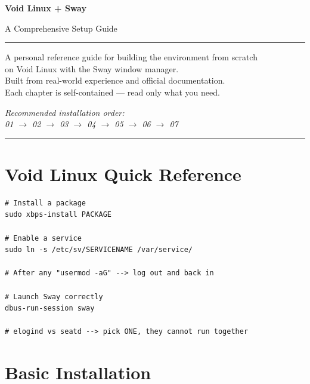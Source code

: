 \documentclass[12pt, a4paper]{book}
\begin{document}
\begin{titlepage}
  \centering
  \vspace*{4cm}
  {\Huge\bfseries Void Linux + Sway\par}
  \vspace{0.8cm}
  {\Large A Comprehensive Setup Guide\par}
  \vspace{1.5cm}
  \rule{0.5\textwidth}{0.5pt}
  \vspace{1.5cm}\par
  {\normalsize
  A personal reference guide for building the environment from scratch\\
  on Void Linux with the Sway window manager.\\[0.4em]
  Built from real-world experience and official documentation.\\[0.4em]
  Each chapter is self-contained --- read only what you need.
  \par}
  \vspace{2cm}
  {\normalsize\itshape Recommended installation order:\\[0.3em]
  01 $\to$ 02 $\to$ 03 $\to$ 04 $\to$ 05 $\to$ 06 $\to$ 07}
  \vfill
  \rule{0.4\textwidth}{0.3pt}
\end{titlepage}

\tableofcontents
\clearpage

\chapter*{Void Linux Quick Reference}

\begin{lstlisting}
# Install a package
sudo xbps-install PACKAGE

# Enable a service
sudo ln -s /etc/sv/SERVICENAME /var/service/

# After any "usermod -aG" --> log out and back in

# Launch Sway correctly
dbus-run-session sway

# elogind vs seatd --> pick ONE, they cannot run together
\end{lstlisting}

\chapter{Basic Installation}
\end{document}
